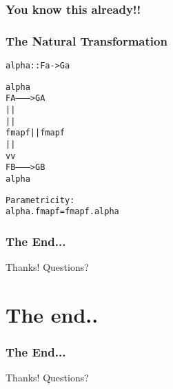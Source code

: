 \documentclass[12pt, xcolor=table]{beamer}
\begin{document}
\begin{comment}
Further examples

Maybe
-----
> data Maybe x = Just x | Nothing

> instance Functor Maybe where
>   fmap f (Just x) = Just (f x)
>   fmap f Nothing = Nothing


> fmap (++ "ho") (Just "hey")

Trees
-----
> data Tree x = Empty | Node x (Tree x) (Tree x)

> instance Functor Tree where
>   fmap f Empty = Empty
>   fmap f (Node x left right) = Node (f x) (fmap f left) (fmap f right)
\end{comment}

\begin{frame}
    \frametitle{You know this already!!}
\end{frame}

\begin{frame}
    \frametitle{The Natural Transformation}
\begin{alltt}
    alpha            ::  F a -> G a


               alpha\\
         F A ---------> G A\\
           |            |\\
           |            |\\
    fmap f |            | fmap f\\
           |            |\\
           v            v\\
         F B ---------> G B\\
               alpha


Parametricity:\\
alpha . fmap f    =  fmap f . alpha
\end{alltt}
\end{frame}



\begin{frame}
    \frametitle{The End...}
    \begin{block}{Thanks!}
        Questions?
    \end{block}
\end{frame}


\section{The end..} %
\begin{frame}
    \frametitle{The End...}
    \begin{block}{Thanks!}
        Questions?
    \end{block}
\end{frame}
\end{document}
